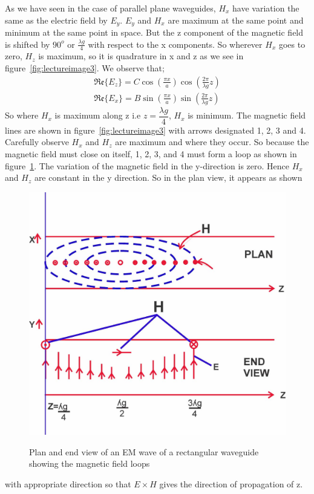 As we have seen in the case of parallel plane waveguides, $H_{x}$ have variation the same as the electric field by $E_{y}$. $E_{y}$ and $H_{x}$ are maximum at the same point and minimum at the same point in space. But the z component of the magnetic field is shifted by $90^{o}$ or $\frac{\lambda g}{4}$ with respect to the x components. So wherever $H_{x}$ goes to zero, $H_{z}$ is maximum, so it is quadrature in x and z as we see in figure~\ref{fig:lectureimage3}. We observe that;
\begin{align}
\mathfrak{Re}\{E_z\} = C\cos(\frac{\pi x}{a})\cos(\frac{2\pi}{\lambda g}z)\\
\mathfrak{Re}\{E_{x}\} = B\sin(\frac{\pi x}{a})\sin(\frac{2\pi}{\lambda g}z)
\end{align}
So where $H_{x}$ is maximum along z i.e  $z=\dfrac{\lambda g}{4}$, $H_{x}$ is minimum. The magnetic field lines are shown in figure~\ref{fig:lectureimage3} with arrows designated 1, 2, 3 and 4. Carefully observe $H_{x}$ and $H_{z}$ are maximum and where they occur. So because the magnetic field must close on itself, 1, 2, 3, and 4 must form a loop as shown in figure~\ref{fig:image1}. The variation of the magnetic field in the y-direction is zero. Hence $H_{x}$ and $H_{z}$ are constant in the y direction. So in the plan view, it appears as shown 
\begin{figure}[h]
\centering
\includegraphics[width=1\linewidth]{./graphics/image-1.jpg}
\label{fig:image1}
\caption{Plan and end view of an EM wave of a rectangular waveguide showing the magnetic field loops}
\end{figure}
with appropriate direction so that $E\times H$ gives the direction of propagation of z. 

